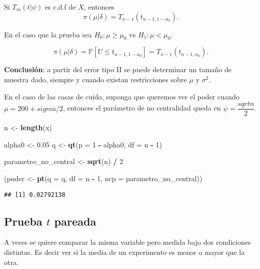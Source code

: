 \documentclass[
  12pt,
]{book}
\newenvironment{Shaded}{\begin{snugshade}}{\end{snugshade}}
\newcommand{\DataTypeTok}[1]{\textcolor[rgb]{0.13,0.29,0.53}{#1}}
\newcommand{\DecValTok}[1]{\textcolor[rgb]{0.00,0.00,0.81}{#1}}
\newcommand{\FloatTok}[1]{\textcolor[rgb]{0.00,0.00,0.81}{#1}}
\newcommand{\KeywordTok}[1]{\textcolor[rgb]{0.13,0.29,0.53}{\textbf{#1}}}
\newcommand{\NormalTok}[1]{#1}
\newcommand{\OperatorTok}[1]{\textcolor[rgb]{0.81,0.36,0.00}{\textbf{#1}}}
\newcommand{\StringTok}[1]{\textcolor[rgb]{0.31,0.60,0.02}{#1}}
\begin{document}
Si \(T_m(t|\psi)\) es c.d.f de \(X\), entonces
\[\pi(\mu|\delta)= T_{n-1}(t_{n-1,1-\alpha_0}).\]

En el caso que la prueba sea \(H_0: \mu \geq \mu_0\) vs \(H_1: \mu<\mu_0\).

\[\pi(\mu|\delta)= \mathbb P[U\leq t_{n-1,1-\alpha_0}] = T_{n-1}(t_{n-1,\alpha_0}).\]

\textbf{Conclusión}: a partir del error tipo II se puede determinar un tamaño de
muestra dado, siempre y cuando existan restricciones sobre \(\mu\) y \(\sigma^2\).

En el caso de las casas de cuido, suponga que queremos ver el poder cuando \(\mu = 200 + sigma/2\), entonces el parámetro de no centralidad queda en \(\psi = \dfrac{sqrt{n}}{2}\).

\begin{Shaded}
\begin{Highlighting}[]
\NormalTok{n \textless{}{-}}\StringTok{ }\KeywordTok{length}\NormalTok{(x)}

\NormalTok{alpha0 \textless{}{-}}\StringTok{ }\FloatTok{0.05}
\NormalTok{q \textless{}{-}}\StringTok{ }\KeywordTok{qt}\NormalTok{(}\DataTypeTok{p =} \DecValTok{1} \OperatorTok{{-}}\StringTok{ }\NormalTok{alpha0, }\DataTypeTok{df =}\NormalTok{ n }\OperatorTok{{-}}\StringTok{ }\DecValTok{1}\NormalTok{)}

\NormalTok{parametro\_no\_central \textless{}{-}}\StringTok{ }\KeywordTok{sqrt}\NormalTok{(n) }\OperatorTok{/}\StringTok{ }\DecValTok{2}

\NormalTok{(poder \textless{}{-}}\StringTok{ }\KeywordTok{pt}\NormalTok{(}\DataTypeTok{q =}\NormalTok{ q, }\DataTypeTok{df =}\NormalTok{ n }\OperatorTok{{-}}\StringTok{ }\DecValTok{1}\NormalTok{, }\DataTypeTok{ncp =}\NormalTok{ parametro\_no\_central))}
\end{Highlighting}
\end{Shaded}

\begin{verbatim}
## [1] 0.02792138
\end{verbatim}

\hypertarget{prueba-t-pareada}{%
\subsection{\texorpdfstring{Prueba \(t\) pareada}{Prueba t pareada}}\label{prueba-t-pareada}}

A veces se quiere comparar la misma variable pero medida bajo dos condiciones
distintas. Es decir ver si la media de un experimento es menor o mayor que la
otra.
\end{document}
